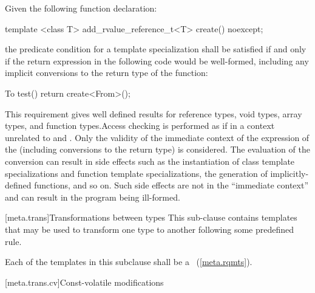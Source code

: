 \pnum
Given the following function declaration:

\begin{codeblock}
template <class T>
  add_rvalue_reference_t<T> create() noexcept;
\end{codeblock}

the predicate condition for a template specialization 
shall be satisfied if and only if the return expression in the following code would be
well-formed, including any implicit conversions to the return type of the function:

\begin{codeblock}
To test() {
  return create<From>();
}
\end{codeblock}

\enternote This requirement gives well defined results for reference types, void
types, array types, and function types.\exitnote Access checking is performed as
if in a context unrelated to  and . Only the validity of
the immediate context of the expression of the 
(including conversions to the return type) is considered. \enternote The
evaluation of the conversion can result in side effects such as the
instantiation of class template specializations and function template
specializations, the generation of implicitly-defined functions, and so on. Such
side effects are not in the ``immediate context'' and can result in the program
being ill-formed. \exitnote

[meta.trans]{Transformations between types}
\pnum
This sub-clause contains templates that may be used to transform one
type to another following some predefined rule.

\pnum
Each of the templates in this subclause shall be a
~(\ref{meta.rqmts}).

[meta.trans.cv]{Const-volatile modifications}

